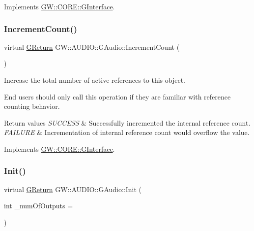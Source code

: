 Implements \mbox{\hyperlink{class_g_w_1_1_c_o_r_e_1_1_g_interface_aacf5834174a7024f8a3c361122ee9e76}{G\+W\+::\+C\+O\+R\+E\+::\+G\+Interface}}.

\mbox{\label{class_g_w_1_1_a_u_d_i_o_1_1_g_audio_aba5697a3a308026ecaa12737d6fe6705}} 
\subsubsection{\texorpdfstring{Increment\+Count()}{IncrementCount()}}
{\footnotesize\ttfamily virtual \mbox{\hyperlink{namespace_g_w_a67a839e3df7ea8a5c5686613a7a3de21}{G\+Return}} G\+W\+::\+A\+U\+D\+I\+O\+::\+G\+Audio\+::\+Increment\+Count (\begin{DoxyParamCaption}{ }\end{DoxyParamCaption})\hspace{0.3cm}{\ttfamily [pure virtual]}}



Increase the total number of active references to this object. 

End users should only call this operation if they are familiar with reference counting behavior.


\begin{DoxyRetVals}{Return values}
{\em S\+U\+C\+C\+E\+SS} & Successfully incremented the internal reference count. \\
\hline
{\em F\+A\+I\+L\+U\+RE} & Incrementation of internal reference count would overflow the value. \\
\hline
\end{DoxyRetVals}


Implements \mbox{\hyperlink{class_g_w_1_1_c_o_r_e_1_1_g_interface_a2d710f20bb78e544e8309b5b75c21260}{G\+W\+::\+C\+O\+R\+E\+::\+G\+Interface}}.

\mbox{\label{class_g_w_1_1_a_u_d_i_o_1_1_g_audio_ab4084083e5b785d9a8ed74f768788ca2}} 
\subsubsection{\texorpdfstring{Init()}{Init()}}
{\footnotesize\ttfamily virtual \mbox{\hyperlink{namespace_g_w_a67a839e3df7ea8a5c5686613a7a3de21}{G\+Return}} G\+W\+::\+A\+U\+D\+I\+O\+::\+G\+Audio\+::\+Init (\begin{DoxyParamCaption}\item[{int}]{\+\_\+num\+Of\+Outputs = {} }\end{DoxyParamCaption})\hspace{0.3cm}{\ttfamily [pure virtual]}}



